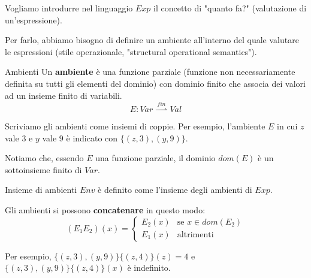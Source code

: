 \documentclass[a4paper,11pt]{report}
\begin{document}
Vogliamo introdurre nel linguaggio \( Exp \) il concetto di "quanto fa?" (valutazione di un'espressione).

Per farlo, abbiamo bisogno di definire un ambiente all'interno del quale valutare le espressioni (stile operazionale, "structural operational semantics").

\begin{defbox}{Ambienti}{}
    Un \textbf{ambiente} è una funzione parziale (funzione non necessariamente definita su tutti gli elementi del dominio) con dominio finito che associa dei valori ad un insieme finito di variabili.
    \[ E : Var \ \overset{fin}{\rightharpoonup} \ Val  \]

    Scriviamo gli ambienti come insiemi di coppie. Per esempio, l'ambiente \( E \) in cui \( z \) vale \( 3 \) e \( y \) vale \( 9 \) è indicato con \( \{(z, 3), (y, 9)\} \).

    Notiamo che, essendo \( E \) una funzione parziale, il dominio \( dom(E) \) è un sottoinsieme finito di \( Var \).

    \begin{defbox}[colframe=DarkOrchid]{Insieme di ambienti}{}
        \( Env \) è definito come l'insieme degli ambienti di \( Exp \).

    \end{defbox}

\end{defbox}

\vspace{0.5em}

Gli ambienti si possono \textbf{concatenare} in questo modo:
\[ (E_1 E_2)(x) = \begin{cases}
    E_2(x) & \text{se } x\in dom(E_2) \\
    E_1(x) & \text{altrimenti}
\end{cases}
\]

Per esempio, \( \{(z, 3), (y, 9)\}\{(z, 4)\}(z) = 4 \) e \( \{(z, 3), (y, 9)\}\{(z, 4)\}(x) \) è indefinito.

\vspace{0.5em}
\end{document}
